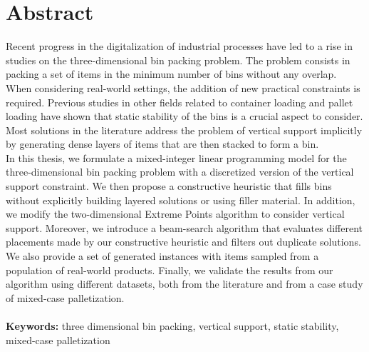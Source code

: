 
\chapter*{Abstract} 
Recent progress in the digitalization of industrial processes have led to a rise in studies on the three-dimensional bin packing problem.
The problem consists in packing a set of items in the minimum number of bins without any overlap.
When considering real-world settings, the addition of new practical constraints is required.
Previous studies in other fields related to container loading and pallet loading have shown that static stability of the bins is a crucial aspect to consider.
Most solutions in the literature address the problem of vertical support implicitly by generating dense layers of items that are then stacked to form a bin.
\\
In this thesis, we formulate a mixed-integer linear programming model for the three-dimensional bin packing problem with a discretized version of the vertical support constraint.
We then propose a constructive heuristic that fills bins without explicitly building layered solutions or using filler material.
In addition, we modify the two-dimensional Extreme Points algorithm to consider vertical support.
Moreover, we introduce a beam-search algorithm that evaluates different placements made by our constructive heuristic and filters out duplicate solutions.
We also provide a set of generated instances with items sampled from a population of real-world products.
Finally, we validate the results from our algorithm using different datasets, both from the literature and from a case study of mixed-case palletization.
\\
\\
\textbf{Keywords:} three dimensional bin packing, vertical support, static stability, mixed-case palletization
